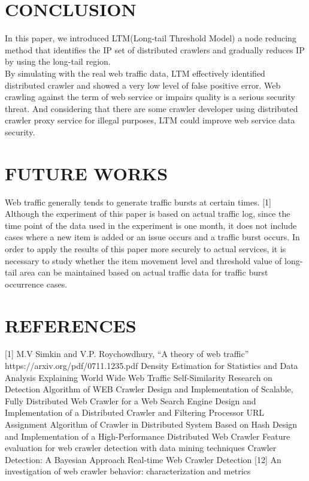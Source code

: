 \documentclass[sigconf,anonymous=true]{acmart}
\begin{document}
%
%
\section{CONCLUSION}
In this paper, we introduced LTM(Long-tail Threshold Model) a node reducing method that identifies the IP set of distributed crawlers and gradually reduces IP by using the long-tail region.\\
By simulating with the real web traffic data, LTM effectively identified distributed crawler and showed a very low level of false positive error.
Web crawling against the term of web service or impairs quality is a serious security threat. And considering that there are some crawler developer using distributed crawler proxy service for illegal purposes, LTM could improve web service data security.


%
%
\section{FUTURE WORKS}
Web traffic generally tends to generate traffic bursts at certain times. [1] Although the experiment of this paper is based on actual traffic log, since the time point of the data used in the experiment is one month, it does not include cases where a new item is added or an issue occurs and a traffic burst occurs.
In order to apply the results of this paper more securely to actual services, it is necessary to study whether the item movement level and threshold value of long-tail area can be maintained based on actual traffic data for traffic burst occurrence cases.



%
%
\section{REFERENCES}
[1]	M.V Simkin and V.P. Roychowdhury, “A theory of web traffic” https://arxiv.org/pdf/0711.1235.pdf
\newline[2] Density Estimation for Statistics and Data Analysis
\newline[3] Explaining World Wide Web Traffic Self-Similarity
\newline[4] Research on Detection Algorithm of WEB Crawler
\newline[5] Design and Implementation of Scalable, Fully Distributed Web Crawler for a Web Search Engine
\newline[6] Design and Implementation of a Distributed Crawler and Filtering Processor
\newline[7] URL Assignment Algorithm of Crawler in Distributed System Based on Hash
\newline[8] Design and Implementation of a High-Performance Distributed Web Crawler
\newline[9] Feature evaluation for web crawler detection with data mining techniques
\newline[10] Crawler Detection: A Bayesian Approach
\newline[11] Real-time Web Crawler Detection
[12] An investigation of web crawler behavior: characterization and metrics








%
\end{document}
